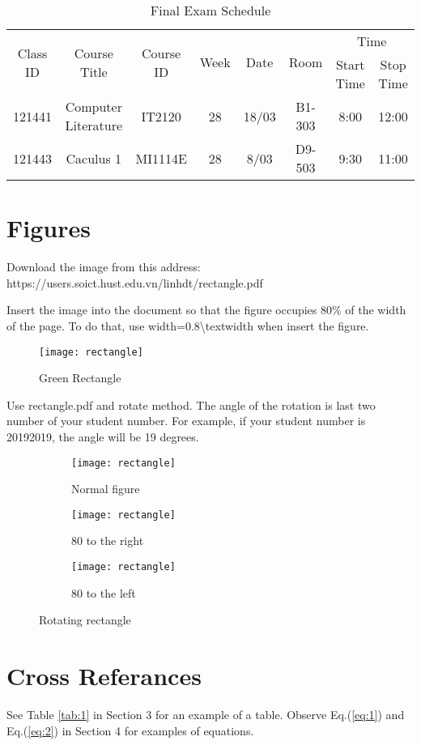 \documentclass{article}
\begin{document}
\begin{table}[htp]
\centering
\caption{Final Exam Schedule}
\begin{tabular}{|c|c|c|c|c|c|c|c|}
\hline
\multirow{2}{*}{Class ID}&\multirow{2}{*}{Course Title}&\multirow{2}{*}{Course ID}&\multirow{2}{*}{Week}&\multirow{2}{*}{Date}&\multirow{2}{*}{Room}&\multicolumn{2}{c|}{Time}\\
\cline{7-8}
& & & & & &Start Time&Stop Time\\\hline
121441&Computer Literature&IT2120&28&18/03&B1-303&8:00&12:00\\\hline
121443&Caculus 1&MI1114E&28&8/03&D9-503&9:30&11:00\\\hline
\end{tabular}
\label{tab:2}
\end{table}
\section{Figures}
Download the image from this address:\\
https://users.soict.hust.edu.vn/linhdt/rectangle.pdf

Insert the image into the document so that the figure occupies 80\% of the width of the page. To do that, use width=0.8\textbackslash textwidth when insert the figure. 
\begin{figure}[htp]
	\centering
	\texttt{[image: rectangle]}
	\caption{Green Rectangle}
\end{figure}
Use rectangle.pdf and rotate method. The angle of the rotation is last two number of your student number. For example, if your student number is 20192019, the angle will be 19 degrees.

\begin{figure}[htp]
\centering

\begin{subfigure}[b]{0.3\textwidth}
\centering
\texttt{[image: rectangle]}
\caption{Normal figure}
\end{subfigure}
\hfill
\begin{subfigure}[b]{0.3\textwidth}
\centering
\texttt{[image: rectangle]}
\caption{80 to the right}
\end{subfigure}
\hfill
\begin{subfigure}[b]{0.3\textwidth}
\centering
\texttt{[image: rectangle]}
\caption{80 to the left}
\end{subfigure}
\caption{Rotating rectangle}
\end{figure}

\section{Cross Referances}
See Table \ref{tab:1} in Section 3 for an example of a table. Observe Eq.(\ref{eq:1}) and Eq.(\ref{eq:2}) in Section 4 for examples of equations.

\tableofcontents
\listoffigures
\listoftables
\end{document}
